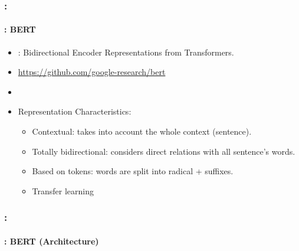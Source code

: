 \documentclass[xcolor=table]{beamer}
\begin{document}
\begin{frame}
	\frametitle{\insertshortsubtitle: \insertsection}
	\framesubtitle{\insertsubsection: BERT}

	\begin{minipage}{.71\textwidth}
		\begin{itemize}
			\item {}: Bidirectional Encoder Representations from Transformers.
			\item \url{https://github.com/google-research/bert}
			\item \cite{2019-devlin-al}
			\item Representation Characteristics:
			\begin{itemize}
				\item Contextual: takes into account the whole context (sentence).
				\item Totally bidirectional: considers direct relations with all sentence's words. 
				\item Based on tokens: words are split into radical + suffixes.
				\item Transfer learning
			\end{itemize}
		\end{itemize}
	\end{minipage}
	\begin{minipage}{.27\textwidth}
		\vspace{1.1cm}
	\end{minipage}
	
\end{frame}

\begin{frame}
	\frametitle{\insertshortsubtitle: \insertsection}
	\framesubtitle{\insertsubsection: BERT (Architecture)}
	
	\begin{center}
	\end{center}
	
\end{frame}
\end{document}
